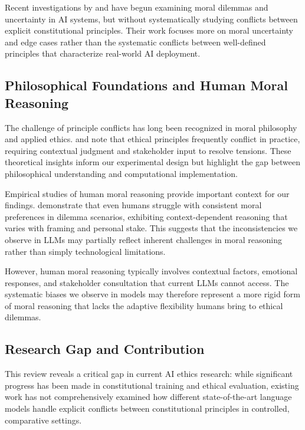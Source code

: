 \documentclass[10pt,a4paper]{article}
\begin{document}
Recent investigations by \citet{jin2022moral} and \citet{emelin2021moral} have begun examining moral dilemmas and uncertainty in AI systems, but without systematically studying conflicts between explicit constitutional principles. Their work focuses more on moral uncertainty and edge cases rather than the systematic conflicts between well-defined principles that characterize real-world AI deployment.

\subsection{Philosophical Foundations and Human Moral Reasoning}
The challenge of principle conflicts has long been recognized in moral philosophy and applied ethics. \citet{floridi2019translating} and \citet{jobin2019global} note that ethical principles frequently conflict in practice, requiring contextual judgment and stakeholder input to resolve tensions. These theoretical insights inform our experimental design but highlight the gap between philosophical understanding and computational implementation.

Empirical studies of human moral reasoning provide important context for our findings. \citet{bonnefon2016social} demonstrate that even humans struggle with consistent moral preferences in dilemma scenarios, exhibiting context-dependent reasoning that varies with framing and personal stake. This suggests that the inconsistencies we observe in LLMs may partially reflect inherent challenges in moral reasoning rather than simply technological limitations.

However, human moral reasoning typically involves contextual factors, emotional responses, and stakeholder consultation that current LLMs cannot access. The systematic biases we observe in models may therefore represent a more rigid form of moral reasoning that lacks the adaptive flexibility humans bring to ethical dilemmas.

\subsection{Research Gap and Contribution}
This review reveals a critical gap in current AI ethics research: while significant progress has been made in constitutional training and ethical evaluation, existing work has not comprehensively examined how different state-of-the-art language models handle explicit conflicts between constitutional principles in controlled, comparative settings.
\end{document}
